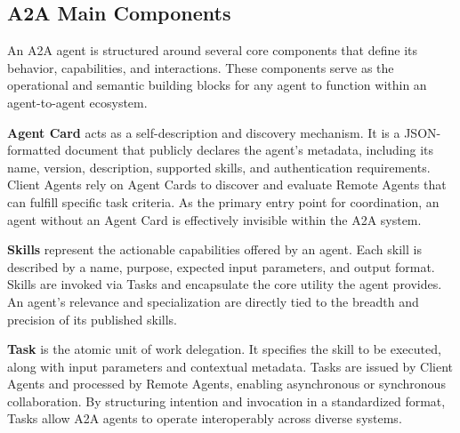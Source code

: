 \documentclass{article}
\begin{document}


\subsection{A2A Main Components}

An A2A agent is structured around several core components that define its behavior, capabilities, and interactions. These components serve as the operational and semantic building blocks for any agent to function within an agent-to-agent ecosystem.

 \textbf{Agent Card} acts as a self-description and discovery mechanism. It is a JSON-formatted document that publicly declares the agent’s metadata, including its name, version, description, supported skills, and authentication requirements. Client Agents rely on Agent Cards to discover and evaluate Remote Agents that can fulfill specific task criteria. As the primary entry point for coordination, an agent without an Agent Card is effectively invisible within the A2A system.

\textbf{Skills} represent the actionable capabilities offered by an agent. Each skill is described by a name, purpose, expected input parameters, and output format. Skills are invoked via Tasks and encapsulate the core utility the agent provides. An agent’s relevance and specialization are directly tied to the breadth and precision of its published skills.

\textbf{Task} is the atomic unit of work delegation. It specifies the skill to be executed, along with input parameters and contextual metadata. Tasks are issued by Client Agents and processed by Remote Agents, enabling asynchronous or synchronous collaboration. By structuring intention and invocation in a standardized format, Tasks allow A2A agents to operate interoperably across diverse systems.
\end{document}
